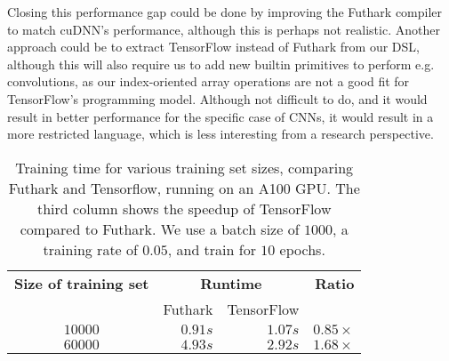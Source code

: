 Closing this performance gap could be done by improving the Futhark
compiler to match cuDNN's performance, although this is perhaps not
realistic. Another approach could be to extract TensorFlow instead of
Futhark from our DSL, although this will also require us to add new
builtin primitives to perform e.g. convolutions, as our index-oriented
array operations are not a good fit for TensorFlow's programming
model. Although not difficult to do, and it would result in better
performance for the specific case of CNNs, it would result in a more
restricted language, which is less interesting from a research
perspective.

\begin{table}
\begin{tabular}{crrr}
\textbf{Size of training set} & \multicolumn{2}{c}{\textbf{Runtime}} & \textbf{Ratio} \\
& Futhark & TensorFlow & \\
$10000$ & $0.91s$ & $1.07s$ & $0.85\times{}$ \\
$60000$ & $4.93s$ & $2.92s$ & $1.68\times{}$
\end{tabular}
\caption{Training time for various training set sizes, comparing
  Futhark and Tensorflow, running on an A100 GPU. The third column
  shows the speedup of TensorFlow compared to Futhark. We use a batch
  size of $1000$, a training rate of $0.05$, and train for $10$
  epochs.}
\label{tab:performance}
\end{table}

%
